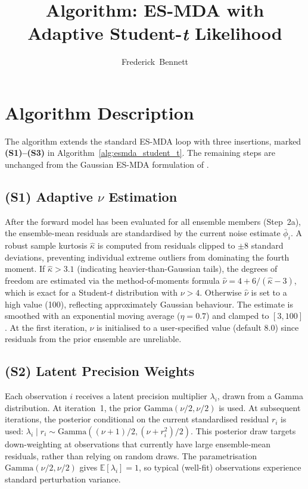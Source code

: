 \documentclass[article,nojss]{jss}
\title{Algorithm: ES-MDA with Adaptive Student-\emph{t} Likelihood}
\author{Frederick~Bennett}
\begin{document}
\section{Algorithm Description}

The algorithm extends the standard ES-MDA loop with three insertions,
marked \textbf{(S1)--(S3)} in Algorithm~\ref{alg:esmda_student_t}.
The remaining steps are unchanged from the Gaussian ES-MDA formulation
of \cite{Emerick2013}.

\subsection*{(S1) Adaptive $\nu$ Estimation}

After the forward model has been evaluated for all ensemble members
(Step~2a), the ensemble-mean residuals are standardised by the current
noise estimate $\bar{\phi}_i$.
A robust sample kurtosis $\hat{\kappa}$ is computed from residuals
clipped to $\pm 8$ standard deviations, preventing individual extreme
outliers from dominating the fourth moment.
If $\hat{\kappa} > 3.1$ (indicating heavier-than-Gaussian tails), the
degrees of freedom are estimated via the method-of-moments formula
$\hat{\nu} = 4 + 6/(\hat{\kappa} - 3)$, which is exact for a
Student-$t$ distribution with $\nu > 4$.
Otherwise $\hat{\nu}$ is set to a high value (100), reflecting
approximately Gaussian behaviour.
The estimate is smoothed with an exponential moving average
($\eta = 0.7$) and clamped to $[3, 100]$.
At the first iteration, $\nu$ is initialised to a user-specified value
(default 8.0) since residuals from the prior ensemble are unreliable.

\subsection*{(S2) Latent Precision Weights}

Each observation $i$ receives a latent precision multiplier $\lambda_i$,
drawn from a Gamma distribution.
At iteration~1, the prior $\text{Gamma}(\nu/2, \nu/2)$ is used.
At subsequent iterations, the posterior conditional on the current
standardised residual $r_i$ is used:
$\lambda_i \mid r_i \sim \text{Gamma}((\nu+1)/2, (\nu+r_i^2)/2)$.
This posterior draw targets down-weighting at observations that currently
have large ensemble-mean residuals, rather than relying on random draws.
The parametrisation $\text{Gamma}(\nu/2, \nu/2)$ gives $\mathbb{E}[\lambda_i]
= 1$, so typical (well-fit) observations experience standard perturbation
variance.
\end{document}
